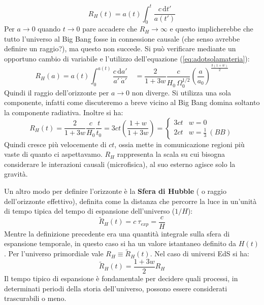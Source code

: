 \begin{equation}
    R_H (t) = a(t) \int_0^t \frac{c\, \mathrm{d}t'}{a(t')} \label{eq:raggioriz}
\end{equation}
Per $a \rightarrow 0$ quando $ t \rightarrow 0$ pare accadere che $R_H \rightarrow \infty$ e questo implicherebbe che tutto l'universo al Big Bang fosse in connessione causale (che senso avrebbe definire un raggio?), ma questo non succede. Si può verificare mediante un opportuno cambio di variabile e l'utilizzo dell'equazione (\ref{eq:adotsolamateria}):
\begin{equation*}
    R_H (a) = a(t) \int_0^{a(t)} \frac{c\, \mathrm{d}a'}{a' \: \dot{a}'} \quad = \frac{2}{1+3w} \frac{c}{H_0\, \Omega_0^{1/2}} \left ( \frac{a}{a_0} \right)^{\frac{3(1+w)}{2}}
\end{equation*}
Quindi il raggio dell'orizzonte per $a \rightarrow 0$ non diverge. Si utilizza una sola componente, infatti come discuteremo a breve vicino al Big Bang domina soltanto la componente radiativa. Inoltre si ha:
\begin{equation}
    R_H (t) = \frac{2}{1+3w}\frac{c}{H_0}\frac{t}{t_0} = 3ct \left ( \frac{1+w}{ 1+3w} \right )= \left\{\begin{matrix}
3ct & w=0\\ 
2ct & w=\frac{1}{3}\: (BB)
\end{matrix}\right.
\end{equation}
Quindi cresce più velocemente di $ct$, ossia mette in comunicazione regioni più vaste di quanto ci aspettavamo. $R_H$ rappresenta la scala su cui bisogna considerare le interazioni causali (microfisica), al suo esterno agisce solo la gravità.

Un altro modo per definire l'orizzonte è la \textbf{Sfera di Hubble} ( o raggio dell'orizzonte effettivo), definita come la distanza che percorre la luce in un'unità di tempo tipica del tempo di espansione dell'universo ($1/H$): 
\begin{equation}
    \tilde{R}_H (t) = c\: \tau_{exp} = \frac{c}{H}
\end{equation}
Mentre la definizione precedente era una quantità integrale sulla sfera di espansione temporale, in questo caso si ha un valore istantaneo definito da $H(t)$. Per l'universo primordiale vale $R_H \equiv \tilde{R}_H (t)$. Nel caso di universi EdS si ha:
\begin{equation*}
    \tilde{R}_H (t) =  \frac{1+3w}{2} R_H
\end{equation*}
Il tempo tipico di espansione è fondamentale per decidere quali processi, in determinati periodi della storia dell'universo, possono essere considerati trascurabili o meno.

